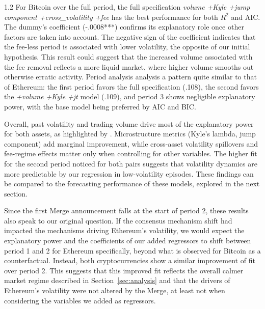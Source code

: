 \documentclass[10pt]{article}
\begin{document}
\begin{setstretch}{1.2}
For Bitcoin over the full period, the full specification \textit{volume +Kyle +jump component +cross\_volatility +fee} has the best performance for both $R^2$ and AIC. The dummy's coefficient (-.0008***) confirms its explanatory role once other factors are taken into account. The negative sign of the coefficient indicates that the fee-less period is associated with lower volatility, the opposite of our initial hypothesis. This result could suggest that the increased volume associated with the fee removal reflects a more liquid market, where higher volume smooths out otherwise erratic activity. Period analysis analysis a pattern quite similar to that of Ethereum: the first period favors the full specification (.108), the second favors the \textit{+volume +Kyle +jt} model (.109), and period 3 shows negligible explanatory power, with the base model being preferred by AIC and BIC.

Overall, past volatility and trading volume drive most of the explanatory power for both assets, as highlighted by \textcite{Tseng2015}. Microstructure metrics (Kyle's lambda, jump component) add marginal improvement, while cross-asset volatility spillovers and fee-regime effects matter only when controlling for other variables. The higher fit for the second period noticed for both pairs suggests that volatility dynamics are more predictable by our regression in low-volatility episodes. These findings can be compared to the forecasting performance of these models, explored in the next section.

Since the first Merge announcement falls at the start of period 2, these results also speak to our original question. If the consensus mechanism shift had impacted the mechanisms driving Ethereum's volatility, we would expect the explanatory power and the coefficients of our added regressors to shift between period 1 and 2 for Ethereum specifically, beyond what is observed for Bitcoin as a counterfactual. Instead, both cryptocurrencies show a similar improvement of fit over period 2. This suggests that this improved fit reflects the overall calmer market regime described in Section~\ref{sec:analysis} and that the drivers of Ethereum's volatility were not altered by the Merge, at least not when considering the variables we added as regressors.




\end{setstretch}
\end{document}
